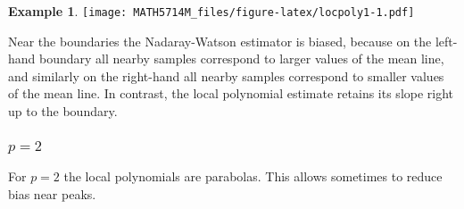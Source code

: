 \documentclass[
  a4paper,
]{article}
\theoremstyle{definition}
\theoremstyle{definition}
\newtheorem{example}{Example}[section]
\theoremstyle{definition}
\theoremstyle{definition}
\theoremstyle{remark}
\begin{document}
\begin{example}
\texttt{[image: MATH5714M\_files/figure-latex/locpoly1-1.pdf]}

Near the boundaries the Nadaray-Watson estimator is biased, because on
the left-hand boundary all nearby samples correspond to larger values of the
mean line, and similarly on the right-hand all nearby samples correspond to
smaller values of the mean line. In contrast, the local polynomial estimate
retains its slope right up to the boundary.
\end{example}

\hypertarget{p-2}{%
\subsubsection*{\texorpdfstring{\(p = 2\)}{p = 2}}\label{p-2}}

For \(p=2\) the local polynomials are parabolas. This allows sometimes to reduce
bias near peaks.
\end{document}
